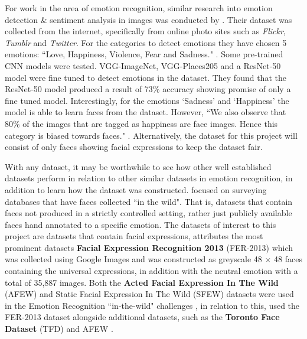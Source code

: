 \documentclass[report, 11pt, oneside]{dissertation}
\begin{document}
For work in the area of emotion recognition, similar research into emotion detection \& sentiment analysis in images was conducted by \citep{Gajarla:us}. Their dataset was collected from the internet, specifically from online photo sites such as \textit{Flickr}, \textit{Tumblr} and \textit{Twitter}. For the categories to detect emotions they have chosen 5 emotions: ``Love, Happiness, Violence, Fear and Sadness." \citep[2]{Gajarla:us}. Some pre-trained CNN models were tested. VGG-ImageNet, VGG-Places205 and a ResNet-50 model were fine tuned to detect emotions in the dataset. They found that the ResNet-50 model produced a result of 73\% accuracy showing promise of only a fine tuned model. Interestingly, for the emotions `Sadness' and `Happiness' the model is able to learn faces from the dataset. However, ``We also observe that 80\% of the images that are tagged as happiness are face images. Hence this category is biased towards faces." \citep[3]{Gajarla:us}. Alternatively, the dataset for this project will consist of only faces showing facial expressions to keep the dataset fair.

With any dataset, it may be worthwhile to see how other well established datasets perform in relation to other similar datasets in emotion recognition, in addition to learn how the dataset was constructed. \citep{Zafeiriou:2016kn} focused on surveying databases that have faces collected ``in the wild". That is, datasets that contain faces not produced in a strictly controlled setting, rather just publicly available faces hand annotated to a specific emotion. The datasets of interest to this project are datasets that contain facial expressions, \citeauthor{Zafeiriou:2016kn} attributes the most prominent datasets \textbf{Facial Expression Recognition 2013} (FER-2013) which was collected using Google Images and was constructed as greyscale 48 $ \times $ 48 faces containing the universal expressions, in addition with the neutral emotion with a total of 35,887 images. Both the \textbf{Acted Facial Expression In The Wild} (AFEW) and Static Facial Expression In The Wild (SFEW) datasets were used in the Emotion Recognition ``in-the-wild" challenges \citeyearpar[1490]{Zafeiriou:2016kn}, in relation to this, \citeauthor{Kahou:2015cr} used the FER-2013 dataset alongside additional datasets, such as the \textbf{Toronto Face Dataset} (TFD) and AFEW \citeyearpar[468]{Kahou:2015cr}. 
\end{document}
